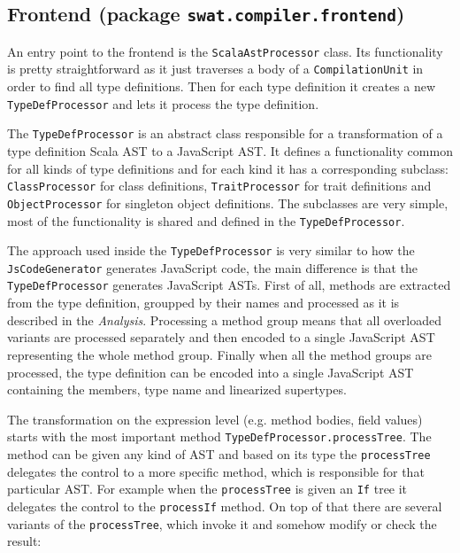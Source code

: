 \documentclass[12pt,a4paper]{report}
\begin{document}
\subsection{Frontend (package \texttt{swat.compiler.frontend})}

An entry point to the frontend is the \texttt{ScalaAstProcessor} class. Its functionality is pretty straightforward as it just traverses a body of a \texttt{CompilationUnit} in order to find all type definitions. Then for each type definition it creates a new \texttt{TypeDefProcessor} and lets it process the type definition.

The \texttt{TypeDefProcessor} is an abstract class responsible for a transformation of a type definition Scala AST to a JavaScript AST. It defines a functionality common for all kinds of type definitions and for each kind it has a corresponding subclass: \texttt{ClassProcessor} for class definitions, \texttt{TraitProcessor} for trait definitions and \texttt{ObjectProcessor} for singleton object definitions. The subclasses are very simple, most of the functionality is shared and defined in the \texttt{TypeDefProcessor}.

The approach used inside the \texttt{TypeDefProcessor} is very similar to how the \texttt{JsCodeGenerator} generates JavaScript code, the main difference is that the \texttt{TypeDefProcessor} generates JavaScript ASTs. First of all, methods are extracted from the type definition, groupped by their names and processed as it is described in the {\it Analysis}. Processing a method group means that all overloaded variants are processed separately and then encoded to a single JavaScript AST representing the whole method group. Finally when all the method groups are processed, the type definition can be encoded into a single JavaScript AST containing the members, type name and linearized supertypes.

The transformation on the expression level (e.g. method bodies, field values) starts with the most important method \texttt{TypeDefProcessor.processTree}. The method can be given any kind of AST and based on its type the \texttt{processTree} delegates the control to a more specific method, which is responsible for that particular AST. For example when the \texttt{processTree} is given an \texttt{If} tree it delegates the control to the \texttt{processIf} method. On top of that there are several variants of the \texttt{processTree}, which invoke it and somehow modify or check the result: 
\end{document}

